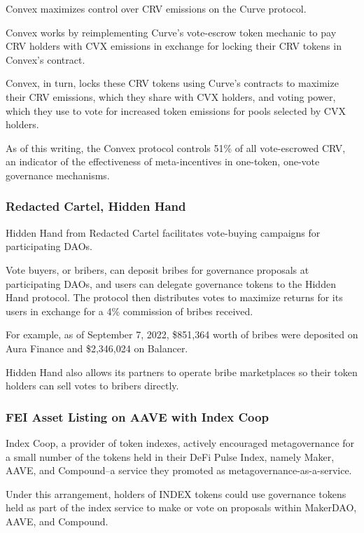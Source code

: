 \documentclass[
]{article}
\begin{document}
Convex maximizes control over CRV emissions on the Curve protocol.

Convex works by reimplementing Curve's vote-escrow token mechanic to pay
CRV holders with CVX emissions in exchange for locking their CRV tokens
in Convex's contract.

Convex, in turn, locks these CRV tokens using Curve's contracts to
maximize their CRV emissions, which they share with CVX holders, and
voting power, which they use to vote for increased token emissions for
pools selected by CVX holders.

As of this writing, the Convex protocol controls 51\% of all
vote-escrowed CRV, an indicator of the effectiveness of meta-incentives
in one-token, one-vote governance mechanisms.

\hypertarget{redacted-cartel-hidden-hand}{%
\subsubsection{Redacted Cartel, Hidden
Hand}\label{redacted-cartel-hidden-hand}}

Hidden Hand from Redacted Cartel facilitates vote-buying campaigns for
participating DAOs.

Vote buyers, or bribers, can deposit bribes for governance proposals at
participating DAOs, and users can delegate governance tokens to the
Hidden Hand protocol. The protocol then distributes votes to maximize
returns for its users in exchange for a 4\% commission of bribes
received.

For example, as of September 7, 2022, \$851,364 worth of bribes were
deposited on Aura Finance and \$2,346,024 on Balancer.

Hidden Hand also allows its partners to operate bribe marketplaces so
their token holders can sell votes to bribers directly.

\hypertarget{fei-asset-listing-on-aave-with-index-coop}{%
\subsubsection{FEI Asset Listing on AAVE with Index
Coop}\label{fei-asset-listing-on-aave-with-index-coop}}

Index Coop, a provider of token indexes, actively encouraged
metagovernance for a small number of the tokens held in their DeFi Pulse
Index, namely Maker, AAVE, and Compound--a service they promoted as
metagovernance-as-a-service.

Under this arrangement, holders of INDEX tokens could use governance
tokens held as part of the index service to make or vote on proposals
within MakerDAO, AAVE, and Compound.
\end{document}

